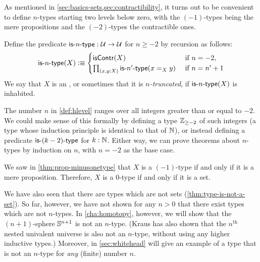 As mentioned in \autoref{sec:basics-sets,sec:contractibility}, it turns out to be convenient to define $n$-types starting two levels below zero, with the $(-1)$-types being the mere propositions and the $(-2)$-types the contractible ones.

\begin{defn}\label{def:hlevel}
  Define the predicate $\mathsf{is}\mbox{-}{n}\mbox{-}\mathsf{type} : \mathcal{U} \to \mathcal{U}$ for $n \geq -2$ by recursion as follows:
  \[ \istype{n}(X) \defeq
  \begin{cases}
    \iscontr(X) & \text{ if } n = -2 , \\
    \prd{x,y : X} \istype{n'}(\id[X]{x}{y}) & \text{ if } n = n'+1
  \end{cases}
  \]
  We say that $X$ is an , or sometimes that it is \emph{$n$-truncated},
 if $\mathsf{is}\mbox{-}{n}\mbox{-}\mathsf{type}(X)$ is inhabited.
\end{defn}

\begin{rmk}
  The number $n$ in \autoref{def:hlevel} ranges over all integers greater than or equal to $-2$.
  We could make sense of this formally by defining a type $\mathbb{Z}_{{\geq}-2}$ of such integers (a type whose induction principle is identical to that of $\mathbb{N}$), or instead defining a predicate $\mathsf{is}\mbox{-}{(k-2)}\mbox{-}\mathsf{type}$ for $k : \mathbb{N}$.
  Either way, we can prove theorems about $n$-types by induction on $n$, with $n = -2$ as the base case.
\end{rmk}

\begin{eg}
  We saw in \autoref{thm:prop-minusonetype} that $X$ is a $(-1)$-type if and only if it is a mere proposition.
  Therefore, $X$ is a $0$-type if and only if it is a set.
\end{eg}

We have also seen that there are types which are not sets (\autoref{thm:type-is-not-a-set}).
So far, however, we have not shown for any $n>0$ that there exist types which are not $n$-types.
In \autoref{cha:homotopy}, however, we will show that the $(n+1)$-sphere $\mathbb{S}^{n+1}$ is not an $n$-type.
(Kraus has also shown that the $n^{\mathrm{th}}$ nested univalent universe is also not an $n$-type, without using any higher inductive types.)
Moreover, in \autoref{sec:whitehead} will give an example of a type that is not an $n$-type for \emph{any} (finite) number $n$.


